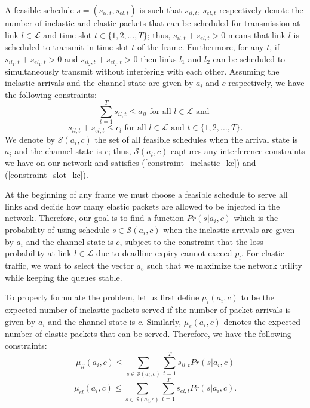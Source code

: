 \documentclass[conference]{IEEEtran}
\begin{document}
A feasible schedule $s=( s_{il,t}, s_{el,t} )$ is such that $s_{il,t}$, $s_{el,t}$ respectively denote the number of inelastic and elastic packets that can be scheduled for transmission at link $l \in \mathcal{L}$ and time slot $t \in \{ 1, 2, \ldots, T \}$; thus, $s_{il,t} + s_{el,t} > 0$ means that link $l$ is scheduled to transmit in time slot $t$ of the frame. Furthermore, for any $t$, if $s_{il_1,t} + s_{el_1,t} > 0$ and $s_{il_2,t} + s_{el_2,t} > 0$ then links $l_1$ and $l_2$ can be scheduled to simultaneously transmit without interfering with each other. Assuming the inelastic arrivals and the channel state are given by $a_i$ and $c$ respectively, we have the following constraints:
\begin{equation}
\label{constraint_inelastic_kc}
 \sum_{t=1}^{T} s_{il,t} \leq a_{il} \mbox{ for all } l \in \mathcal{L} \mbox{ and }
\end{equation}
\begin{equation}
\label{constraint_slot_kc}
 s_{il,t} + s_{el,t} \leq c_l \mbox{ for all } l \in \mathcal{L} \mbox{ and } t \in \{ 1, 2, \ldots, T \}.
\end{equation}
We denote by $\mathcal{S}(a_i, c)$ the set of all feasible schedules when the arrival state is $a_i$ and the channel state is $c$; thus, $\mathcal{S}(a_i, c)$ captures any interference constraints we have on our network and satisfies (\ref{constraint_inelastic_kc}) and (\ref{constraint_slot_kc}).

At the beginning of any frame we must choose a feasible schedule to serve all links and decide how many elastic packets are allowed to be injected in the network. Therefore, our goal is to find a function $Pr( s | a_i, c)$ which is the probability of using schedule $s \in \mathcal{S}(a_i, c)$ when the inelastic arrivals are given by $a_i$ and the channel state is $c$, subject to the constraint that the loss probability at link $l \in \mathcal{L}$ due to deadline expiry cannot exceed $p_l$. For elastic traffic, we want to select the vector $a_e$ such that we maximize the network utility while keeping the queues stable.

To properly formulate the problem, let us first define $\mu_{i}(a_i,c)$ to be the expected number of inelastic packets served if the number of packet arrivals is given by $a_i$ and the channel state is $c$. Similarly, $\mu_{e}(a_i,c)$ denotes the expected number of elastic packets that can be served. Therefore, we have the following constraints:
\begin{equation*}
\mu_{il}(a_i,c) \leq \sum\limits_{s \in \mathcal{S}(a_i, c)} \sum_{t=1}^{T} s_{il,t} Pr(s | a_i, c)
\end{equation*}
\begin{equation*}
\mu_{el}(a_i,c) \leq \sum\limits_{s \in \mathcal{S}(a_i, c)} \sum_{t=1}^{T} s_{el,t} Pr(s | a_i, c).
\end{equation*}
\end{document}
